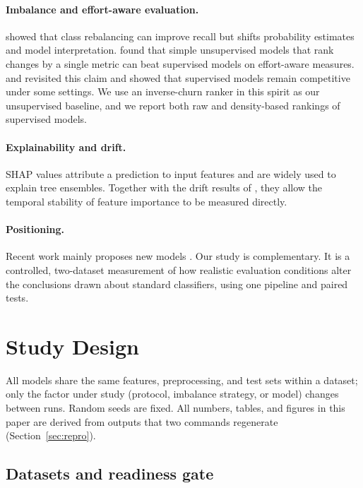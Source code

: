 \paragraph{Imbalance and effort-aware evaluation.}
\citet{tantithamthavorn2020} showed that class rebalancing can improve recall but shifts probability estimates and model interpretation. \citet{yang2016} found that simple unsupervised models that rank changes by a single metric can beat supervised models on effort-aware measures. \citet{fu2017} and \citet{huang2019} revisited this claim and showed that supervised models remain competitive under some settings. We use an inverse-churn ranker in this spirit as our unsupervised baseline, and we report both raw and density-based rankings of supervised models.

\paragraph{Explainability and drift.}
SHAP values \citep{lundberg2017} attribute a prediction to input features and are widely used to explain tree ensembles. Together with the drift results of \citet{mcintosh2018}, they allow the temporal stability of feature importance to be measured directly.

\paragraph{Positioning.}
Recent work mainly proposes new models \citep{hoang2019,hoang2020,pornprasit2021,sahar2024,vandinter2023}. Our study is complementary. It is a controlled, two-dataset measurement of how realistic evaluation conditions alter the conclusions drawn about standard classifiers, using one pipeline and paired tests.

\section{Study Design}\label{sec:design}

All models share the same features, preprocessing, and test sets within a dataset; only the factor under study (protocol, imbalance strategy, or model) changes between runs. Random seeds are fixed. All numbers, tables, and figures in this paper are derived from outputs that two commands regenerate (Section~\ref{sec:repro}).

\subsection{Datasets and readiness gate}\label{sec:data}


